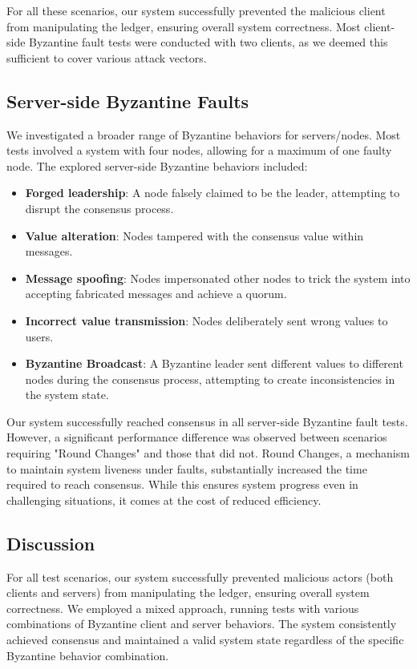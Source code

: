 For all these scenarios, our system successfully prevented the malicious client from manipulating the ledger, ensuring overall system correctness. Most client-side Byzantine fault tests were conducted with two clients, as we deemed this sufficient to cover various attack vectors.

\subsection{Server-side Byzantine Faults} We investigated a broader range of Byzantine behaviors for servers/nodes. Most tests involved a system with four nodes, allowing for a maximum of one faulty node. The explored server-side Byzantine behaviors included:
    \begin{itemize}
        \item \textbf{Forged leadership}: A node falsely claimed to be the leader, attempting to disrupt the consensus process.
        \item \textbf{Value alteration}: Nodes tampered with the consensus value within messages.
        \item \textbf{Message spoofing}: Nodes impersonated other nodes to trick the system into accepting fabricated messages and achieve a quorum.
        \item \textbf{Incorrect value transmission}: Nodes deliberately sent wrong values to users.
        \item \textbf{Byzantine Broadcast}: A Byzantine leader sent different values to different nodes during the consensus process, attempting to create inconsistencies in the system state.
    \end{itemize}

Our system successfully reached consensus in all server-side Byzantine fault tests. However, a significant performance difference was observed between scenarios requiring "Round Changes" and those that did not. Round Changes, a mechanism to maintain system liveness under faults, substantially increased the time required to reach consensus. While this ensures system progress even in challenging situations, it comes at the cost of reduced efficiency.

\subsection{Discussion}

For all test scenarios, our system successfully prevented malicious actors (both clients and servers) from manipulating the ledger, ensuring overall system correctness. We employed a mixed approach, running tests with various combinations of Byzantine client and server behaviors. The system consistently achieved consensus and maintained a valid system state regardless of the specific Byzantine behavior combination.

